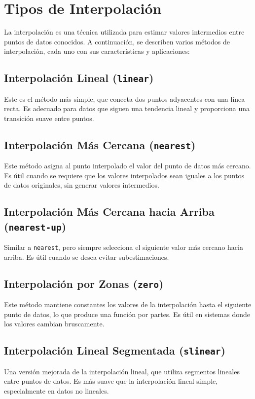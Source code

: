 \documentclass[12pt]{article}
\author{Vale Fernando Alexis}
\begin{document}
\section{Tipos de Interpolación}

La interpolación es una técnica utilizada para estimar valores intermedios 
entre puntos de datos conocidos. A continuación, se describen varios métodos 
de interpolación, cada uno con sus características y aplicaciones:

\subsection{Interpolación Lineal (\texttt{linear})}
Este es el método más simple, que conecta dos puntos adyacentes con una 
línea recta. Es adecuado para datos que siguen una tendencia lineal y 
proporciona una transición suave entre puntos.

\subsection{Interpolación Más Cercana (\texttt{nearest})}
Este método asigna al punto interpolado el valor del punto de datos más
 cercano. Es útil cuando se requiere que los valores interpolados sean 
 iguales a los puntos de datos originales, sin generar valores intermedios.

\subsection{Interpolación Más Cercana hacia Arriba (\texttt{nearest-up})}
Similar a \texttt{nearest}, pero siempre selecciona el siguiente valor más 
cercano hacia arriba. Es útil cuando se desea evitar subestimaciones.

\subsection{Interpolación por Zonas (\texttt{zero})}
Este método mantiene constantes los valores de la interpolación hasta el 
siguiente punto de datos, lo que produce una función por partes. Es útil 
en sistemas donde los valores cambian bruscamente.

\subsection{Interpolación Lineal Segmentada (\texttt{slinear})}
Una versión mejorada de la interpolación lineal, que utiliza segmentos 
lineales entre puntos de datos. Es más suave que la interpolación lineal 
simple, especialmente en datos no lineales.
\end{document}
